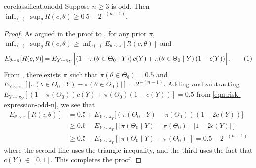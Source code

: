 \documentclass[12pt,reqno]{amsart}
\theoremstyle{theorem}
\theoremstyle{definition}
\newcommand\numberthis{\addtocounter{equation}{1}\tag{\theequation}}
\newcommand{\0}{\mathbf{0}}
\newcommand{\1}{\mathbf{1}}
\begin{document}
\begin{restatable}{cor}{classificationodd}
\label{cor:classification-odd}
Suppose $n \geq 3$ is odd. Then $\inf_{c(\cdot)} \sup_{\theta} R(c,\theta) \geq 0.5 - 2^{-(n-1)}$.
\end{restatable}

\begin{proof}
As argued in the proof to , for any prior $\pi$,  $\inf_{c(\cdot)} \sup_{\theta} R(c,\theta) \geq \inf_{c(\cdot)} E_{\theta \sim \pi}[ R(c,\theta)]$ and 
\[E_{\theta \sim \pi}[R(c,\theta)] = E_{Y \sim \pi_Y}\Big[
(1-\pi(\theta \in \Theta_0\mid Y))\,c(Y) + \pi(\theta \in \Theta_0\mid Y)\,(1-c(Y))\Big]. \numberthis \label{eqn:risk-expression-odd-n} \]
From , there exists $\pi$ such that $\pi(\theta \in \Theta_0) = 0.5$ and $E_{Y \sim \pi_Y}[ | \pi(\theta \in \Theta_0 \mid Y) - \pi(\theta \in \Theta_0) | ] = 2^{-(n-1)}$. Adding and subtracting $E_{Y \sim \pi_Y}[(1-\pi(\Theta_0)) c(Y) + \pi(\Theta_0) (1-c(Y))] = 0.5 $ from \eqref{eqn:risk-expression-odd-n}, we see that
\begin{align*}
E_{\theta \sim \pi}[R(c,\theta)]  &= 0.5 + E_{Y \sim \pi_Y}\Big[
(\pi(\Theta_0\mid Y) - \pi(\Theta_0) ) (1-2 c(Y)) \Big] \\
& \geq 0.5 - E_{Y \sim \pi_Y}[ | \pi(\Theta_0\mid Y) - \pi(\Theta_0) | \cdot |1-2c(Y)| ] \\
& \geq 0.5 - E_{Y \sim \pi_Y}[ | \pi(\Theta_0\mid Y) - \pi(\Theta_0) | ] = 0.5 - 2^{-(n-1)}
\end{align*}
where the second line uses the triangle inequality, and the third uses the fact that $c(Y) \in [0,1]$. This completes the proof.
\end{proof}


\estimation*
\end{document}
